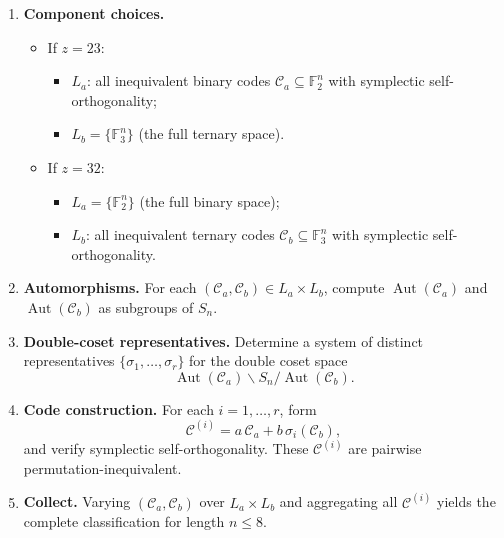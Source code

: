 \documentclass[11pt,a4paper]{article}
\theoremstyle{definition}
\numberwithin{equation}{section}
\newcommand{\F}{\mathbb{F}}
\def\C{{\mathcal{C}}}
\begin{document}
\begin{enumerate}
  \item \textbf{Component choices.}  
    \begin{itemize}
      \item If \(z=23\): 
        \begin{itemize}
          \item \(L_a\): all inequivalent binary codes \(\C_a\subseteq\F_2^n\) with symplectic self-orthogonality;
          \item \(L_b=\{\F_3^n\}\) (the full ternary space).
        \end{itemize}
      \item If \(z=32\):
        \begin{itemize}
          \item \(L_a=\{\F_2^n\}\) (the full binary space);
          \item \(L_b\): all inequivalent ternary codes \(\C_b\subseteq\F_3^n\) with symplectic self-orthogonality.
        \end{itemize}
    \end{itemize}

  \item \textbf{Automorphisms.}  
    For each \((\C_a,\C_b)\in L_a\times L_b\), compute \(\operatorname{Aut}(\C_a)\) and \(\operatorname{Aut}(\C_b)\) as subgroups of \(S_n\).

  \item \textbf{Double-coset representatives.}  
    Determine a system of distinct representatives \(\{\sigma_1,\dots,\sigma_r\}\) for the double coset space
    \[
      \operatorname{Aut}(\C_a)\backslash S_n/\operatorname{Aut}(\C_b).
    \]

  \item \textbf{Code construction.}  
    For each \(i=1,\dots,r\), form
    \[
      \C^{(i)}=a\,\C_a + b\,\sigma_i(\C_b),
    \]
    and verify symplectic self-orthogonality.  These \(\C^{(i)}\) are pairwise permutation-inequivalent.

  \item \textbf{Collect.}  
    Varying \((\C_a,\C_b)\) over \(L_a\times L_b\) and aggregating all \(\C^{(i)}\) yields the complete classification for length \(n\le8\).
\end{enumerate}
\end{document}
